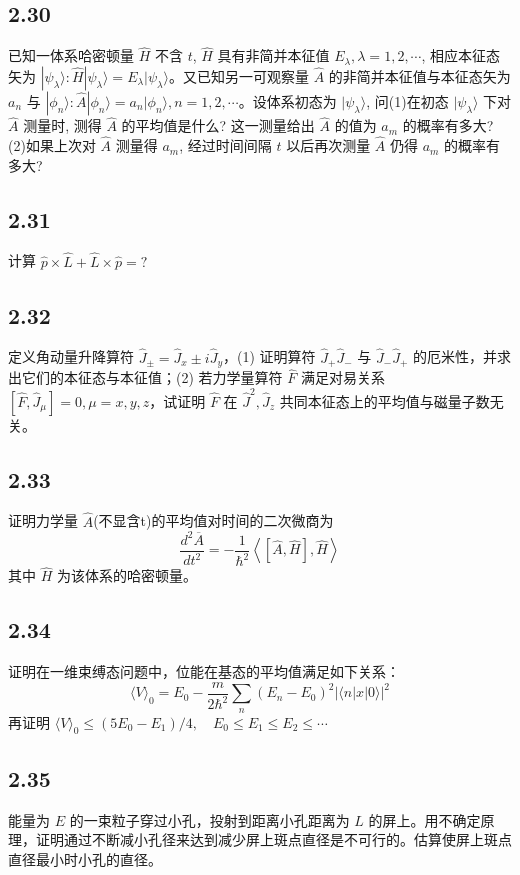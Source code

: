 \subsection{2.30}
已知一体系哈密顿量 $\hat{H}$ 不含 $t$, $\hat{H}$ 具有非简并本征值 $E_{\lambda}, \lambda = 1, 2, \cdots$, 相应本征态矢为 $|\psi_{\lambda}\rangle: \hat{H}|\psi_{\lambda}\rangle = E_{\lambda}|\psi_{\lambda}\rangle$。又已知另一可观察量 $\hat{A}$ 的非简并本征值与本征态矢为 $a_n$ 与 $|\phi_n\rangle: \hat{A}|\phi_n\rangle = a_n|\phi_n\rangle, n = 1, 2, \cdots$。设体系初态为 $|\psi_{\lambda}\rangle$, 问(1)在初态 $|\psi_{\lambda}\rangle$ 下对 $\hat{A}$ 测量时, 测得 $\hat{A}$ 的平均值是什么? 这一测量给出 $\hat{A}$ 的值为 $a_m$ 的概率有多大? (2)如果上次对 $\hat{A}$ 测量得 $a_m$, 经过时间间隔 $t$ 以后再次测量 $\hat{A}$ 仍得 $a_m$ 的概率有多大?

\subsection{2.31}
计算 $\hat{p} \times \hat{L} + \hat{L} \times \hat{p} = ?$

\subsection{2.32}
定义角动量升降算符 $\hat{J}_{\pm} = \hat{J}_x \pm i \hat{J}_y$，(1) 证明算符 $\hat{J}_+ \hat{J}_- $ 与 $\hat{J}_- \hat{J}_+ $ 的厄米性，并求出它们的本征态与本征值；(2) 若力学量算符 $\hat{F}$ 满足对易关系 $[\hat{F}, \hat{J}_{\mu}] = 0, \mu = x, y, z$，试证明 $\hat{F}$ 在 $\hat{J}^2, \hat{J}_z$ 共同本征态上的平均值与磁量子数无关。

\subsection{2.33}
证明力学量 $\hat{A}$(不显含t)的平均值对时间的二次微商为
$$\frac{d^2\overline{A}}{dt^2} = -\frac{1}{\hbar^2} \left\langle \left[ \hat{A}, \hat{H} \right], \hat{H} \right\rangle$$
其中 $\hat{H}$ 为该体系的哈密顿量。

\subsection{2.34}
证明在一维束缚态问题中，位能在基态的平均值满足如下关系：
$$\langle V \rangle_0 = E_0 - \frac{m}{2\hbar^2} \sum_n (E_n - E_0)^2 |\langle n| x | 0 \rangle|^2$$
再证明 $\langle V \rangle_0 \leq (5E_0 - E_1)/4, \quad E_0 \leq E_1 \leq E_2 \leq \cdots$

\subsection{2.35}
能量为 $E$ 的一束粒子穿过小孔，投射到距离小孔距离为 $L$ 的屏上。用不确定原理，证明通过不断减小孔径来达到减少屏上斑点直径是不可行的。估算使屏上斑点直径最小时小孔的直径。


